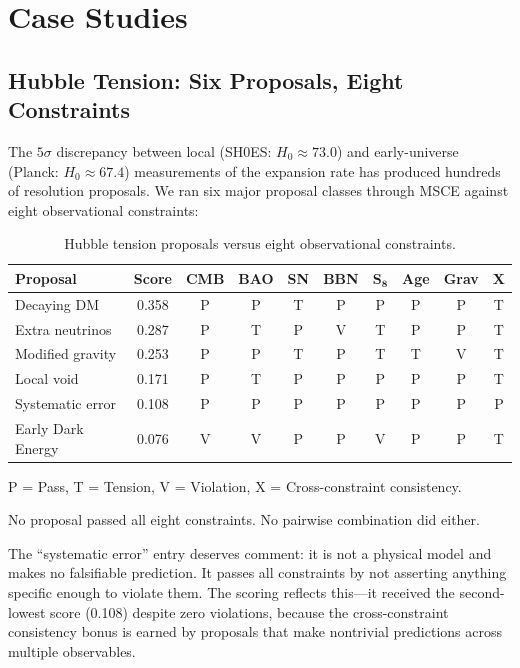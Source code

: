 \documentclass[11pt,a4paper]{article}
\begin{document}
\section{Case Studies}

\subsection{Hubble Tension: Six Proposals, Eight Constraints}

The $5\sigma$ discrepancy between local (SH0ES: $H_0 \approx 73.0$) and early-universe (Planck: $H_0 \approx 67.4$) measurements of the expansion rate \cite{planck2018,riess2022} has produced hundreds of resolution proposals. We ran six major proposal classes through MSCE against eight observational constraints:

\begin{table}[ht]
\centering
\caption{Hubble tension proposals versus eight observational constraints.}
\label{tab:hubble}
{\small
\begin{tabular}{lccccccccc}
\toprule
\textbf{Proposal} & \textbf{Score} & \textbf{CMB} & \textbf{BAO} & \textbf{SN} & \textbf{BBN} & $\mathbf{S_8}$ & \textbf{Age} & \textbf{Grav} & \textbf{X} \\
\midrule
Decaying DM & 0.358 & P & P & T & P & P & P & P & T \\
Extra neutrinos & 0.287 & P & T & P & V & T & P & P & T \\
Modified gravity & 0.253 & P & P & T & P & T & T & V & T \\
Local void & 0.171 & P & T & P & P & P & P & P & T \\
Systematic error & 0.108 & P & P & P & P & P & P & P & P \\
Early Dark Energy & 0.076 & V & V & P & P & V & P & P & T \\
\bottomrule
\end{tabular}}
\par\smallskip
P = Pass, T = Tension, V = Violation, X = Cross-constraint consistency.
\end{table}

No proposal passed all eight constraints. No pairwise combination did either.

The ``systematic error'' entry deserves comment: it is not a physical model and makes no falsifiable prediction. It passes all constraints by not asserting anything specific enough to violate them. The scoring reflects this---it received the second-lowest score (0.108) despite zero violations, because the cross-constraint consistency bonus is earned by proposals that make nontrivial predictions across multiple observables.
\end{document}
